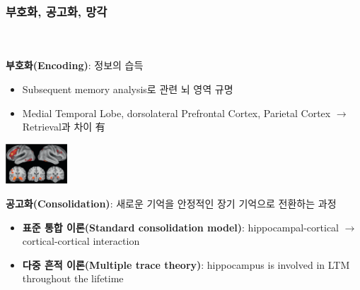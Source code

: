 \documentclass{beamer}
\begin{document}
\subsubsection{부호화, 공고화, 망각}
\begin{frame}
  \\~\\
  
  \textbf{부호화(Encoding)}: 정보의 습득
  \begin{minipage}{0.7\textwidth}
    \vspace{-1em}
    \begin{itemize}
      \item Subsequent memory analysis로 관련 뇌 영역 규명
      \item Medial Temporal Lobe, dorsolateral Prefrontal Cortex, Parietal Cortex $\rightarrow$ Retrieval과 차이 有
    \end{itemize}
    \hfill
  \end{minipage}%
  \begin{minipage}{0.3\textwidth}
    \vspace{-2em}
    \centering
    \includegraphics[height=1.5cm]{image/encoding_brain_regions}
  \end{minipage}

  \textbf{공고화(Consolidation)}: 새로운 기억을 안정적인 장기 기억으로 전환하는 과정
  \begin{itemize}
    \small
    \item \textbf{표준 통합 이론(Standard consolidation model)}: hippocampal-cortical $\rightarrow$ cortical-cortical interaction
    \item \textbf{다중 흔적 이론(Multiple trace theory)}: hippocampus is involved in LTM throughout the lifetime
  \end{itemize}
  \vspace{1.5em}


\end{frame}
\end{document}
